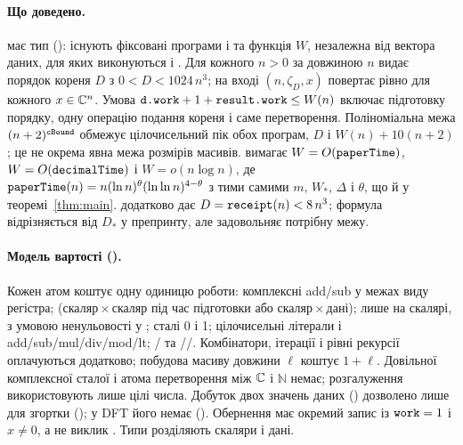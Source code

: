 \documentclass[11pt]{article}
\theoremstyle{plain}
\begin{document}
\paragraph{Що доведено.}
 має тип  (): існують фіксовані програми  і  та функція $W$, незалежна від вектора даних, для яких виконуються  і . Для кожного $n>0$  за довжиною $n$ видає порядок кореня $D$ з $0<D<1024\,n^3$;  на вході $(n,\zeta_D,x)$ повертає рівно  для кожного $x\in\mathbb{C}^n$. Умова $\texttt{d.work}+1+\texttt{result.work}\le W(n)$ включає підготовку порядку, одну операцію подання кореня і саме перетворення. Поліноміальна межа $(n+2)^{\texttt{cBound}}$ обмежує цілочисельний пік обох програм, $D$ і $W(n)+10(n+2)$; це не окрема явна межа розмірів масивів.  вимагає $W=O(\texttt{paperTime})$, $W=O(\texttt{decimalTime})$ і $W=o(n\log n)$, де $\texttt{paperTime}(n)=n(\ln n)^{\theta}(\ln\ln n)^{4-\theta}$ з тими самими $m$, $W_*$, $\Delta$ і $\theta$, що й у теоремі~\ref{thm:main}.  додатково дає $D=\texttt{receipt}(n)<8\,n^3$; формула  відрізняється від $D_*$ у  препринту, але задовольняє потрібну межу.

\paragraph{Модель вартості ().}
Кожен атом коштує одну одиницю роботи: комплексні add/sub у межах виду регістра;  (скаляр${}\times{}$скаляр під час підготовки або скаляр${}\times{}$дані);  лише на скалярі, з умовою ненульовості у ; сталі 0 і 1; цілочисельні літерали і add/sub/mul/div/mod/lt; / та //. Комбінатори, ітерації і рівні рекурсії оплачуються додатково; побудова масиву довжини $\ell$ коштує $1+\ell$. Довільної комплексної сталої і атома перетворення між $\mathbb{C}$ і $\mathbb N$ немає; розгалуження використовують лише цілі числа. Добуток двох значень даних () дозволено лише для згортки (); у DFT його немає (). Обернення має окремий запис із $\texttt{work}=1$ і  $x\ne0$, а не виклик . Типи розділяють скаляри і дані.
\end{document}
